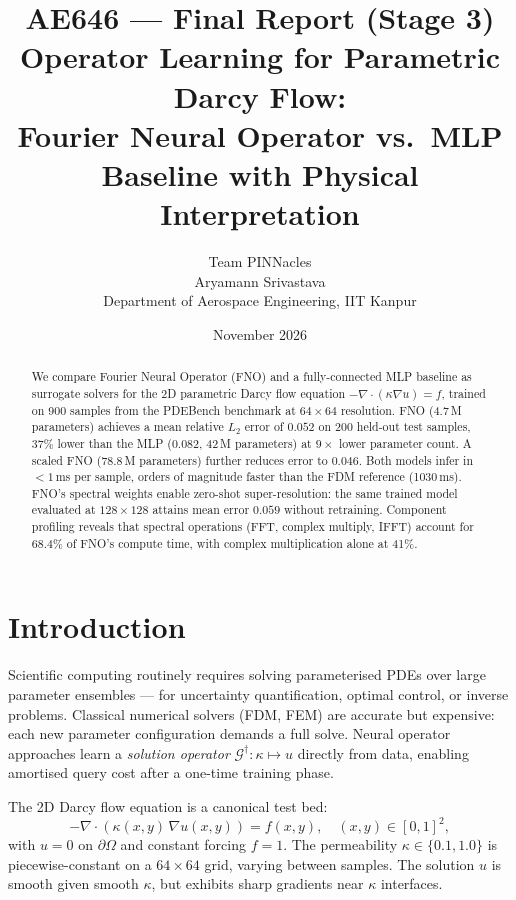 \documentclass[11pt,a4paper]{article}
\title{\textbf{AE646 --- Final Report (Stage 3)}\\[0.5em]
\large Operator Learning for Parametric Darcy Flow:\\
Fourier Neural Operator vs.\ MLP Baseline with Physical Interpretation}
\author{Team PINNacles\\Aryamann Srivastava\\Department of Aerospace Engineering, IIT Kanpur}
\date{November 2026}
\begin{document}
\maketitle

\begin{abstract}
We compare Fourier Neural Operator (FNO) and a fully-connected MLP baseline as surrogate solvers for the 2D parametric Darcy flow equation $-\nabla\cdot(\kappa\nabla u)=f$, trained on 900 samples from the PDEBench benchmark at $64\times64$ resolution. FNO (4.7\,M parameters) achieves a mean relative $L_2$ error of $0.052$ on 200 held-out test samples, $37\%$ lower than the MLP (0.082, 42\,M parameters) at $9\times$ lower parameter count. A scaled FNO (78.8\,M parameters) further reduces error to $0.046$. Both models infer in $<1$\,ms per sample, orders of magnitude faster than the FDM reference (1030\,ms). FNO's spectral weights enable zero-shot super-resolution: the same trained model evaluated at $128\times128$ attains mean error $0.059$ without retraining. Component profiling reveals that spectral operations (FFT, complex multiply, IFFT) account for 68.4\% of FNO's compute time, with complex multiplication alone at 41\%.
\end{abstract}

\tableofcontents
\newpage

\section{Introduction}

Scientific computing routinely requires solving parameterised PDEs over large parameter ensembles --- for uncertainty quantification, optimal control, or inverse problems. Classical numerical solvers (FDM, FEM) are accurate but expensive: each new parameter configuration demands a full solve. Neural operator approaches \cite{li2021fno, kovachki2023neural} learn a \emph{solution operator} $\mathcal{G}^\dagger : \kappa \mapsto u$ directly from data, enabling amortised query cost after a one-time training phase.

The 2D Darcy flow equation is a canonical test bed:
\begin{equation}
  -\nabla \cdot (\kappa(x,y)\,\nabla u(x,y)) = f(x,y), \quad (x,y)\in[0,1]^2,
  \label{eq:darcy}
\end{equation}
with $u = 0$ on $\partial\Omega$ and constant forcing $f=1$. The permeability $\kappa\in\{0.1, 1.0\}$ is piecewise-constant on a $64\times64$ grid, varying between samples. The solution $u$ is smooth given smooth $\kappa$, but exhibits sharp gradients near $\kappa$ interfaces.
\end{document}
